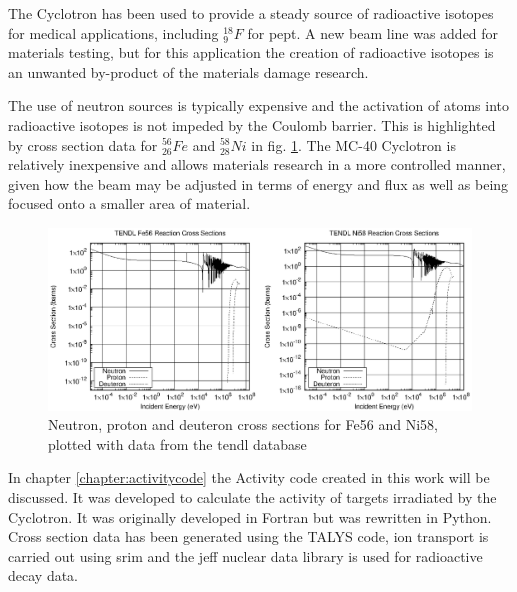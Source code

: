 The Cyclotron has been used to provide a steady source of radioactive isotopes for medical applications, including ${}^{18}_9 F$ for \acrfull{pept}\cite{bhamcyclotron}.  A new beam line was added for materials testing, but for this application the creation of radioactive isotopes is an unwanted by-product of the materials damage research. 

The use of neutron sources is typically expensive and the activation of atoms into radioactive isotopes is not impeded by the Coulomb barrier.  This is highlighted by cross section data for ${}^{56}_{26}Fe$ and ${}^{58}_{28}Ni$ in fig. \ref{fig:fe56ni58xs}.  The MC-40 Cyclotron is relatively inexpensive and allows materials research in a more controlled manner, given how the beam may be adjusted in terms of energy and flux as well as being focused onto a smaller area of material.


\begin{figure}[ht]
  \begin{center}
    \includegraphics[width=.9\linewidth]{chapters/isotope_activation_and_radioactive_decay/plots/npd_xs/fe56_ni58_xs.eps}
    \caption{Neutron, proton and deuteron cross sections for Fe56 and Ni58, plotted with data from the \acrshort{tendl} database\cite{tendl2009}}
    \label{fig:fe56ni58xs}
  \end{center}
\end{figure}

In chapter \ref{chapter:activitycode} the Activity code created in this work will be discussed.  It was developed to calculate the activity of targets irradiated by the Cyclotron.  It was originally developed in Fortran\cite{activitycpc} but was rewritten in Python.  Cross section data has been generated using the TALYS code, ion transport is carried out using \acrshort{srim} and the \acrshort{jeff} \cite{jeff311} nuclear data library is used for radioactive decay data.


\FloatBarrier




